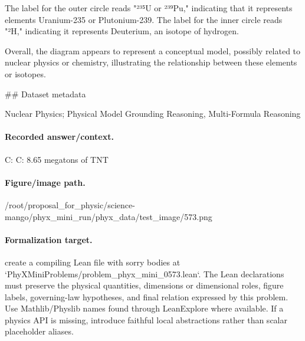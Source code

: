 The label for the outer circle reads "²³⁵U or ²³⁹Pu," indicating that it represents elements Uranium-235 or Plutonium-239. The label for the inner circle reads "²H," indicating it represents Deuterium, an isotope of hydrogen. 

Overall, the diagram appears to represent a conceptual model, possibly related to nuclear physics or chemistry, illustrating the relationship between these elements or isotopes.

\#\# Dataset metadata

Nuclear Physics; Physical Model Grounding Reasoning, Multi-Formula Reasoning

\paragraph{Recorded answer/context.}
C: C: 8.65 megatons of TNT

\paragraph{Figure/image path.}
/root/proposal\_for\_physic/science-mango/phyx\_mini\_run/phyx\_data/test\_image/573.png

\paragraph{Formalization target.}
create a compiling Lean file with sorry bodies at `PhyXMiniProblems/problem\_phyx\_mini\_0573.lean`. The Lean declarations must preserve the physical quantities, dimensions or dimensional roles, figure labels, governing-law hypotheses, and final relation expressed by this problem.
Use Mathlib/Physlib names found through LeanExplore where available. If a physics API is missing, introduce faithful local abstractions rather than scalar placeholder aliases.

